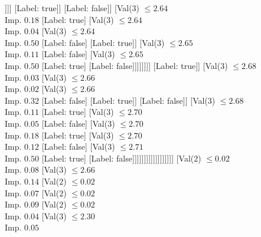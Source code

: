 \documentclass[margin=10pt]{standalone}
\begin{document}
\begin{forest}
																							[Label: false]
																							[Val($3$) $ \leq 2.63$ \\ Imp. $0.50$
																								[Label: true]
																								[Label: false]]]]
																					[Label: true]]
																				[Label: false]]
																			[Val($3$) $ \leq 2.64$ \\ Imp. $0.18$
																				[Label: true]
																				[Val($3$) $ \leq 2.64$ \\ Imp. $0.04$
																					[Val($3$) $ \leq 2.64$ \\ Imp. $0.50$
																						[Label: false]
																						[Label: true]]
																					[Val($3$) $ \leq 2.65$ \\ Imp. $0.11$
																						[Label: false]
																						[Val($3$) $ \leq 2.65$ \\ Imp. $0.50$
																							[Label: true]
																							[Label: false]]]]]]]]
																[Label: true]]
															[Val($3$) $ \leq 2.68$ \\ Imp. $0.03$
																[Val($3$) $ \leq 2.66$ \\ Imp. $0.02$
																	[Val($3$) $ \leq 2.66$ \\ Imp. $0.32$
																		[Label: false]
																		[Label: true]]
																	[Label: false]]
																[Val($3$) $ \leq 2.68$ \\ Imp. $0.11$
																	[Label: true]
																	[Val($3$) $ \leq 2.70$ \\ Imp. $0.05$
																		[Label: false]
																		[Val($3$) $ \leq 2.70$ \\ Imp. $0.18$
																			[Label: true]
																			[Val($3$) $ \leq 2.70$ \\ Imp. $0.12$
																				[Label: false]
																				[Val($3$) $ \leq 2.71$ \\ Imp. $0.50$
																					[Label: true]
																					[Label: false]]]]]]]]]]]]]]]]]]
				[Val($2$) $ \leq 0.02$ \\ Imp. $0.08$
					[Val($3$) $ \leq 2.66$ \\ Imp. $0.14$
						[Val($2$) $ \leq 0.02$ \\ Imp. $0.07$
							[Val($2$) $ \leq 0.02$ \\ Imp. $0.09$
								[Val($2$) $ \leq 0.02$ \\ Imp. $0.04$
									[Val($3$) $ \leq 2.30$ \\ Imp. $0.05$

\end{forest}
\end{document}
